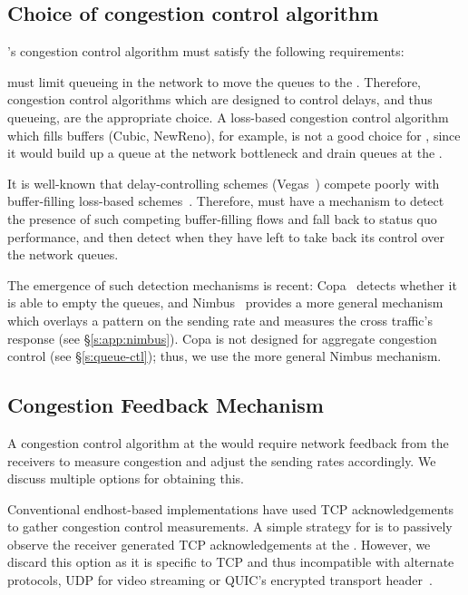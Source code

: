 \subsection{Choice of congestion control algorithm}\label{s:design:whichcc}
\name's congestion control algorithm must satisfy the following requirements: 

 \name must limit queueing in the network to move the queues to the \inbox. Therefore, congestion control algorithms which are designed to control delays, and thus queueing, are the appropriate choice. 
A loss-based congestion control algorithm which fills buffers (\eg Cubic, NewReno), for example, is not a good choice for \name, since it would build up a queue at the network bottleneck and drain queues at the \inbox.

 It is well-known that delay-controlling schemes (\eg Vegas~\cite{vegas}) compete poorly with buffer-filling loss-based schemes~\cite{copa}.
Therefore, \name must have a mechanism to detect the presence of such competing buffer-filling flows and fall back to status quo performance, and then detect when they have left to take back its control over the network queues. 

The emergence of such detection mechanisms is recent: Copa~\cite{copa} detects whether it is able to empty the queues, and Nimbus~\cite{nimbus} provides a more general mechanism which overlays a pattern on the sending rate and measures the cross traffic's response  (see \S\ref{s:app:nimbus}).
Copa is not designed for aggregate congestion control (see \S\ref{s:queue-ctl}); thus, we use the more general Nimbus mechanism.

\subsection{Congestion Feedback Mechanism}\label{s:design:twosided}
A congestion control algorithm at the \inbox would require network feedback from the receivers to measure congestion and adjust the sending rates accordingly. We discuss multiple options for obtaining this. 


Conventional endhost-based implementations have used TCP acknowledgements to gather congestion control measurements. A simple strategy for \name is to passively observe the receiver generated TCP acknowledgements at the \inbox. However, we discard this option as it is specific to TCP and thus incompatible with alternate protocols, \ie UDP for video streaming or QUIC's encrypted transport header~\cite{quic}.

